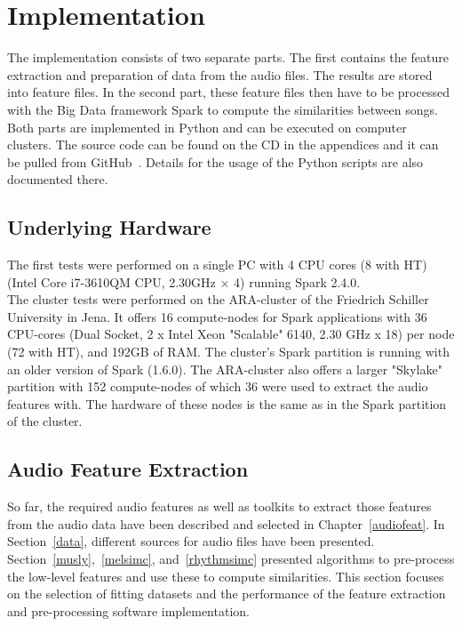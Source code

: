\chapter{Implementation}\label{implementationdet}

The implementation consists of two separate parts. The first contains the feature extraction and preparation of data from the audio files. The results are stored into feature files. In the second part, these feature files then have to be processed with the Big Data framework Spark to compute the similarities between songs.\\ 
Both parts are implemented in Python and can be executed on computer clusters. The source code can be found on the CD in the appendices and it can be pulled from GitHub~\cite{github-code}. Details for the usage of the Python scripts are also documented there.

\section{Underlying Hardware}

The first tests were performed on a single PC with 4 CPU cores (8 with HT) (Intel Core i7-3610QM CPU, 2.30GHz × 4) running Spark 2.4.0.\\ 
The cluster tests were performed on the ARA-cluster of the Friedrich Schiller University in Jena. 
It offers 16 compute-nodes for Spark applications with 36 CPU-cores (Dual Socket, 2 x Intel Xeon "Scalable" 6140, 2.30 GHz x 18) per node (72 with HT), and 192GB of RAM. The cluster's Spark partition is running with an older version of Spark (1.6.0). The ARA-cluster also offers a larger "Skylake" partition with 152 compute-nodes of which 36 were used to extract the audio features with. The hardware of these nodes is the same as in the Spark partition of the cluster.\\

\section{Audio Feature Extraction}\label{simmet}

So far, the required audio features as well as toolkits to extract those features from the audio data have been described and selected in Chapter~\ref{audiofeat}.
In Section~\ref{data}, different sources for audio files have been presented. Section~\ref{musly},~\ref{melsimc}, and~\ref{rhythmsimc} presented algorithms to pre-process the low-level features and use these to compute similarities. 
This section focuses on the selection of fitting datasets %
and the performance of the feature extraction and pre-processing software implementation.  

